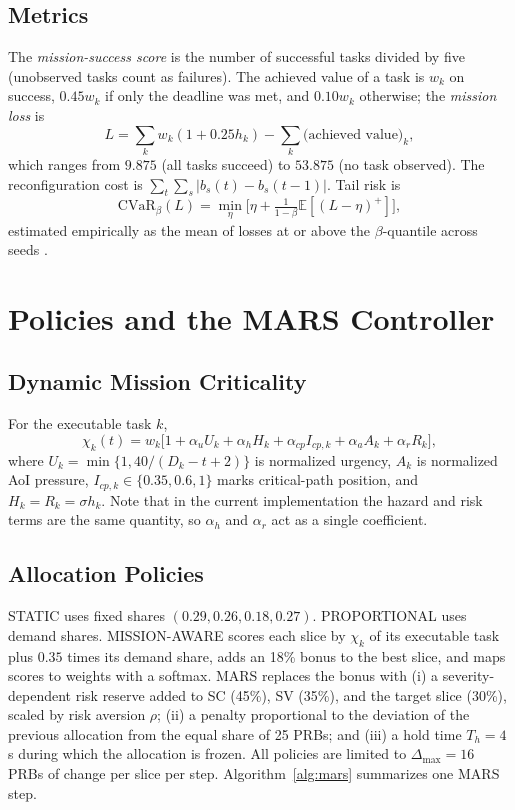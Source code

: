 \documentclass[conference]{IEEEtran}
\begin{document}
\subsection{Metrics}
The \emph{mission-success score} is the number of successful tasks divided by five (unobserved tasks count as failures). The achieved value of a task is $w_k$ on success, $0.45w_k$ if only the deadline was met, and $0.10w_k$ otherwise; the \emph{mission loss} is
\begin{equation}
L=\sum_k w_k(1+0.25h_k) - \sum_k \text{(achieved value)}_k,
\label{eq:loss}
\end{equation}
which ranges from $9.875$ (all tasks succeed) to $53.875$ (no task observed). The reconfiguration cost is $\sum_t\sum_s|b_s(t)-b_s(t-1)|$. Tail risk is
\begin{equation}
\mathrm{CVaR}_{\beta}(L)=\min_{\eta}\Big[\eta+\tfrac{1}{1-\beta}\mathbb{E}[(L-\eta)^+]\Big],
\label{eq:cvar}
\end{equation}
estimated empirically as the mean of losses at or above the $\beta$-quantile across seeds \cite{cvar}.

\section{Policies and the MARS Controller}
\subsection{Dynamic Mission Criticality}
For the executable task $k$,
\begin{equation}
\chi_k(t)=w_k\big[1+\alpha_u U_k+\alpha_h H_k+\alpha_{cp}I_{cp,k}+\alpha_a A_k+\alpha_r R_k\big],
\label{eq:criticality}
\end{equation}
where $U_k=\min\{1,40/(D_k-t+2)\}$ is normalized urgency, $A_k$ is normalized AoI pressure, $I_{cp,k}\in\{0.35,0.6,1\}$ marks critical-path position, and $H_k=R_k=\sigma h_k$. Note that in the current implementation the hazard and risk terms are the same quantity, so $\alpha_h$ and $\alpha_r$ act as a single coefficient.

\subsection{Allocation Policies}
STATIC uses fixed shares $(0.29,0.26,0.18,0.27)$. PROPORTIONAL uses demand shares. MISSION-AWARE scores each slice by $\chi_k$ of its executable task plus $0.35$ times its demand share, adds an 18\% bonus to the best slice, and maps scores to weights with a softmax. MARS replaces the bonus with (i) a severity-dependent risk reserve added to SC (45\%), SV (35\%), and the target slice (30\%), scaled by risk aversion $\rho$; (ii) a penalty proportional to the deviation of the previous allocation from the equal share of 25 PRBs; and (iii) a hold time $T_h=4$\,s during which the allocation is frozen. All policies are limited to $\Delta_{\max}=16$ PRBs of change per slice per step. Algorithm~\ref{alg:mars} summarizes one MARS step.
\end{document}
